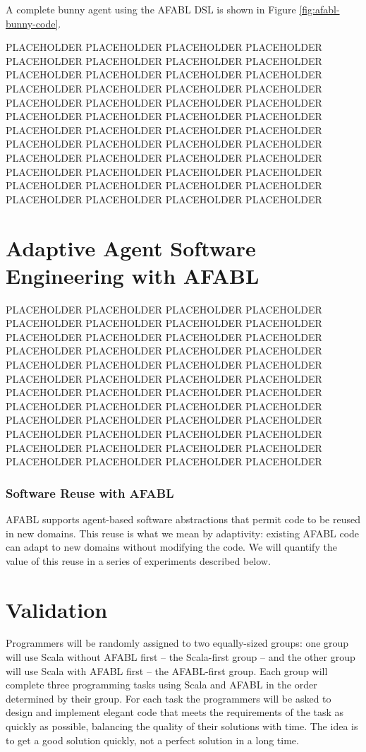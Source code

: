 A complete bunny agent using the AFABL DSL is shown in Figure \ref{fig:afabl-bunny-code}.

PLACEHOLDER PLACEHOLDER PLACEHOLDER PLACEHOLDER PLACEHOLDER PLACEHOLDER PLACEHOLDER PLACEHOLDER PLACEHOLDER PLACEHOLDER PLACEHOLDER PLACEHOLDER PLACEHOLDER PLACEHOLDER PLACEHOLDER PLACEHOLDER PLACEHOLDER PLACEHOLDER PLACEHOLDER PLACEHOLDER PLACEHOLDER PLACEHOLDER PLACEHOLDER PLACEHOLDER PLACEHOLDER PLACEHOLDER PLACEHOLDER PLACEHOLDER PLACEHOLDER PLACEHOLDER PLACEHOLDER PLACEHOLDER PLACEHOLDER PLACEHOLDER PLACEHOLDER PLACEHOLDER PLACEHOLDER PLACEHOLDER PLACEHOLDER PLACEHOLDER PLACEHOLDER PLACEHOLDER PLACEHOLDER PLACEHOLDER PLACEHOLDER PLACEHOLDER PLACEHOLDER PLACEHOLDER


\section{Adaptive Agent Software Engineering with AFABL}

PLACEHOLDER PLACEHOLDER PLACEHOLDER PLACEHOLDER PLACEHOLDER PLACEHOLDER PLACEHOLDER PLACEHOLDER PLACEHOLDER PLACEHOLDER PLACEHOLDER PLACEHOLDER PLACEHOLDER PLACEHOLDER PLACEHOLDER PLACEHOLDER PLACEHOLDER PLACEHOLDER PLACEHOLDER PLACEHOLDER PLACEHOLDER PLACEHOLDER PLACEHOLDER PLACEHOLDER PLACEHOLDER PLACEHOLDER PLACEHOLDER PLACEHOLDER PLACEHOLDER PLACEHOLDER PLACEHOLDER PLACEHOLDER PLACEHOLDER PLACEHOLDER PLACEHOLDER PLACEHOLDER PLACEHOLDER PLACEHOLDER PLACEHOLDER PLACEHOLDER PLACEHOLDER PLACEHOLDER PLACEHOLDER PLACEHOLDER PLACEHOLDER PLACEHOLDER PLACEHOLDER PLACEHOLDER


\subsubsection{Software Reuse with AFABL}

AFABL supports agent-based software abstractions that permit code to be reused in new domains.  This reuse is what we mean by adaptivity: existing AFABL code can adapt to new domains without modifying the code.  We will quantify the value of this reuse in a series of
experiments described below.

\section{Validation}

Programmers will be randomly assigned to two equally-sized groups: one group will use Scala without AFABL first -- the Scala-first group -- and the other group will use Scala with AFABL first -- the AFABL-first group.  Each group will complete three programming tasks using Scala and AFABL in the order determined by their group.  For each task the programmers will be asked to design and implement elegant code that meets the requirements of the task as quickly as possible, balancing the quality of their solutions with time.  The idea is to get a good solution quickly, not a perfect solution in a long time.

